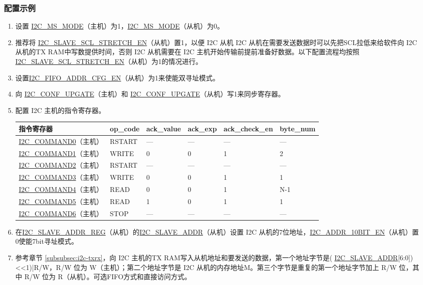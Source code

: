 \documentclass[main\_\_CN.tex]{subfiles}
\begin{document}
\subsubsection{配置示例}
\begin{enumerate}
\item 设置 \hyperref[fielddesc:I2CMSMODE]{I2C\_MS\_MODE}（主机）为1，\hyperref[fielddesc:I2CMSMODE]{I2C\_MS\_MODE}（从机）为0。
\item 推荐将 \hyperref[fielddesc:I2CSLAVESCLSTRETCHEN]{I2C\_SLAVE\_SCL\_STRETCH\_EN}（从机）置1，以便 I2C 从机 I2C 从机在需要发送数据时可以先把SCL拉低来给软件向 I2C 从机的TX RAM中写数提供时间，否则 I2C 从机需要在 I2C 主机开始传输前提前准备好数据。以下配置流程均按照\hyperref[fielddesc:I2CSLAVESCLSTRETCHEN]{I2C\_SLAVE\_SCL\_STRETCH\_EN}（从机）为1的情况进行。 
\item 设置\hyperref[fielddesc:I2CFIFOADDRCFGEN]{I2C\_FIFO\_ADDR\_CFG\_EN}（从机）为1来使能双寻址模式。
\item 向 \hyperref[fielddesc:I2CCONFUPGATE]{I2C\_CONF\_UPGATE}（主机）和 \hyperref[fielddesc:I2CCONFUPGATE]{I2C\_CONF\_UPGATE}（从机）写1来同步寄存器。
\item 配置 I2C 主机的指令寄存器。
\begin{longtable}{ | p{4cm} | p{2cm} | p{2cm} | p{2cm} |p{2cm} | p{2cm} |}
\hline\rowcolor{lightgray}
指令寄存器& op\_code & ack\_value&ack\_exp&ack\_check\_en&byte\_num  \\ \hline
\hyperref[fielddesc:I2CCOMMAND0]{I2C\_COMMAND0}（主机）& RSTART& ---&---&---&---  \\ \hline
\hyperref[fielddesc:I2CCOMMAND1]{I2C\_COMMAND1}（主机）& WRITE& 0&0&1&2  \\ \hline
\hyperref[fielddesc:I2CCOMMAND2]{I2C\_COMMAND2}（主机）& RSTART& ---&---&---&---  \\ \hline
\hyperref[fielddesc:I2CCOMMAND3]{I2C\_COMMAND3}（主机）& WRITE& 0&0&1&1  \\ \hline
\hyperref[fielddesc:I2CCOMMAND4]{I2C\_COMMAND4}（主机）& READ& 0&0&1&N-1  \\ \hline
\hyperref[fielddesc:I2CCOMMAND5]{I2C\_COMMAND5}（主机）& READ& 1&0&1&1  \\ \hline
\hyperref[fielddesc:I2CCOMMAND6]{I2C\_COMMAND6}（主机）& STOP& ---&---&---&---  \\ \hline
\end{longtable}

\item 在\hyperref[regdesc:I2CSLAVEADDRREG]{I2C\_SLAVE\_ADDR\_REG}（从机）的\hyperref[fielddesc:I2CSLAVEADDR]{I2C\_SLAVE\_ADDR}（从机）设置 I2C 从机的7位地址，\hyperref[fielddesc:I2CADDR10BITEN]{I2C\_ADDR\_10BIT\_EN}（从机）置0使能7bit寻址模式。
\item 参考章节 \ref{subsubsec:i2c-txrx}，向 I2C 主机的TX RAM写入从机地址和要发送的数据，第一个地址字节是( \hyperref[fielddesc:I2CSLAVEADDR]{I2C\_SLAVE\_ADDR}[6:0])<<1)|R/W，R/W 位为 W（主机）；第二个地址字节是 I2C 从机的内存地址M。第三个字节是重复的第一个地址字节加上 R/W 位，其中 R/W 位为 R（从机）。可选FIFO方式和直接访问方式。


\end{enumerate}
\end{document}

